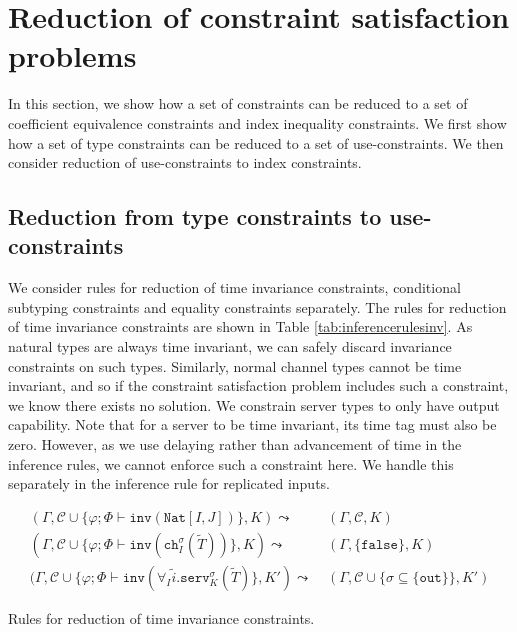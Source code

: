 \section{Reduction of constraint satisfaction problems}\label{sec:redcons}

In this section, we show how a set of constraints can be reduced to a set of coefficient equivalence constraints and index inequality constraints. We first show how a set of type constraints can be reduced to a set of use-constraints. We then consider reduction of use-constraints to index constraints.
\subsection{Reduction from type constraints to use-constraints}
We consider rules for reduction of time invariance constraints, conditional subtyping constraints and equality constraints separately. The rules for reduction of time invariance constraints are shown in Table \ref{tab:inferencerulesinv}. As natural types are always time invariant, we can safely discard invariance constraints on such types. Similarly, normal channel types cannot be time invariant, and so if the constraint satisfaction problem includes such a constraint, we know there exists no solution. We constrain server types to only have output capability. Note that for a server to be time invariant, its time tag must also be zero. However, as we use delaying rather than advancement of time in the inference rules, we cannot enforce such a constraint here. We handle this separately in the inference rule for replicated inputs.\\

\begin{table*}[!ht]
    \begin{framed}\vspace{-1em}\begin{align*}
        (\Gamma,\mathcal{C} \cup \{\varphi;\Phi \vdash \texttt{inv}(\texttt{Nat}[I,J])\},K) \leadsto&\; (\Gamma,\mathcal{C},K)\\
        (\Gamma,\mathcal{C} \cup \{\varphi;\Phi \vdash \texttt{inv}(\texttt{ch}^\sigma_I(\widetilde{T}))\},K) \leadsto&\; (\Gamma,\{\texttt{false}\},K)\\
        (\Gamma,\mathcal{C} \cup \{\varphi;\Phi \vdash \texttt{inv}(\forall_I\widetilde{i}.\texttt{serv}^\sigma_K(\widetilde{T})\},K') \leadsto&\; (\Gamma,\mathcal{C} \cup \{\sigma \subseteq \{\texttt{out}\}\},K')
    \end{align*}\vspace{-1em}\end{framed}
    \smallskip
    \caption{Rules for reduction of time invariance constraints.}
    \label{tab:inferencerulesinv}
\end{table*}

